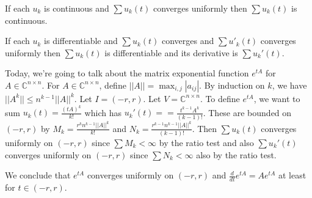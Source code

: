 \documentclass{article}
\newcommand{\C}{\mathbb{C}}
\begin{document}
If each $u_k$ is continuous and $\sum u_k(t)$ converges uniformly then $\sum u_k(t)$ is continuous.

If each $u_k$ is differentiable and $\sum u_k(t)$ converges and $\sum u'_k(t)$ converges uniformly then $\sum u_k(t)$ is differentiable and its derivative is $\sum u_k'(t)$.

Today, we're going to talk about the matrix exponential function $e^{tA}$ for $A\in \C^{n\times n}$. For $A\in \C^{n\times n}$, define $||A||=\max_{i,j}|a_{ij}|$. By induction on $k$, we have $||A^k||\leq n^{k-1}||A||^k$. Let $I=(-r,r)$. Let $V=\C^{n\times n}$. To define $e^{tA}$, we want to sum $u_k(t)=\frac{(tA)^k}{k!}$ which has $u_k'(t)==\frac{t^{k-1}A^k}{(k-1)!}$. These are bounded on $(-r,r)$ by $M_k=\frac{r^kn^{k-1}||A||^k}{k!}$ and $N_k=\frac{r^{k-1}n^{k-1}||A||^k}{(k-1)!}$. Then $\sum u_k(t)$ converges uniformly on $(-r,r)$ since $\sum M_k<\infty$ by the ratio test and also $\sum u_k'(t)$ converges uniformly on $(-r,r)$ since $\sum N_k<\infty$ also by the ratio test.

We conclude that $e^{tA}$ converges uniformly on $(-r,r)$ and $\frac{d}{dt}e^{tA}=Ae^{tA}$ at least for $t\in (-r,r)$.
\end{document}
